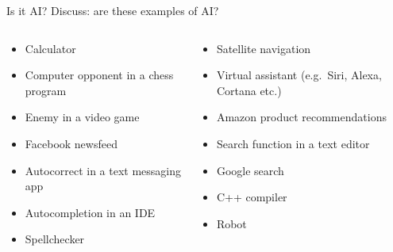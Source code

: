 \begin{frame}{Is it AI?}
	Discuss: are these examples of AI?
	\begin{columns}
		\begin{column}{0.48\textwidth}
			\begin{itemize}
				\pause\item Calculator
				\pause\item Computer opponent in a chess program
				\pause\item Enemy in a video game
				\pause\item Facebook newsfeed
				\pause\item Autocorrect in a text messaging app
				\pause\item Autocompletion in an IDE
				\pause\item Spellchecker
			\end{itemize}
		\end{column}
		\begin{column}{0.48\textwidth}
			\begin{itemize}
				\pause\item Satellite navigation
				\pause\item Virtual assistant (e.g.\ Siri, Alexa, Cortana etc.)
				\pause\item Amazon product recommendations
				\pause\item Search function in a text editor
				\pause\item Google search
				\pause\item C++ compiler
				\pause\item Robot
			\end{itemize}
		\end{column}
	\end{columns}
\end{frame}

